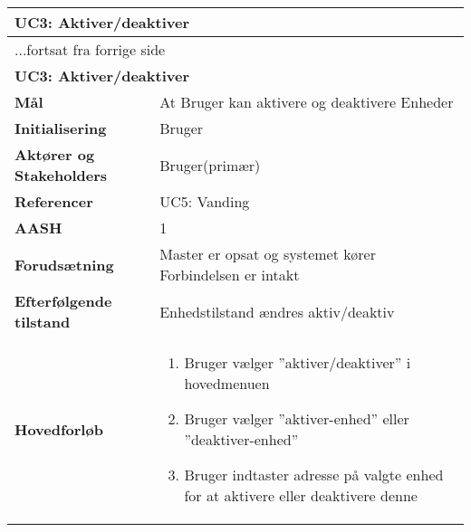 \begin{center} \centering \label{UC3} 
	\begin{longtable}{|p{5cm}|p{9cm}|}  %
	\hline
		\multicolumn{2}{|l|}{\textbf{UC3: Aktiver/deaktiver}} \\\hline %
		\endfirsthead
		
		\multicolumn{2}{l}{...fortsat fra forrige side} \\ \hline %
		\multicolumn{2}{|l|}{\textbf{UC3: Aktiver/deaktiver}} \\\hline %
		\endhead	
		
		\textbf{Mål}								&At Bruger kan aktivere og deaktivere Enheder	\\\hline
		\textbf{Initialisering}					&Bruger				\\\hline
		\textbf{Aktører og Stakeholders}			&Bruger(primær)		\\\hline
		\textbf{Referencer}						&UC5: Vanding		\\\hline
		\textbf{AASH}							&1					\\\hline
		\textbf{Forudsætning}					&Master er opsat og systemet kører \newline
												 Forbindelsen er intakt	\\\hline
		\textbf{Efterfølgende tilstand}			&Enhedstilstand ændres aktiv/deaktiv\\\hline
		\textbf{Hovedforløb}					
			&\begin{enumerate}
	
				\item Bruger vælger ''aktiver/deaktiver'' i hovedmenuen
				
				\item Bruger vælger ''aktiver-enhed'' eller ''deaktiver-enhed''
				
				\item Bruger indtaster adresse på valgte enhed for at aktivere eller deaktivere denne	
	
			\end{enumerate}\\\hline
	\end{longtable}
\end{center}

